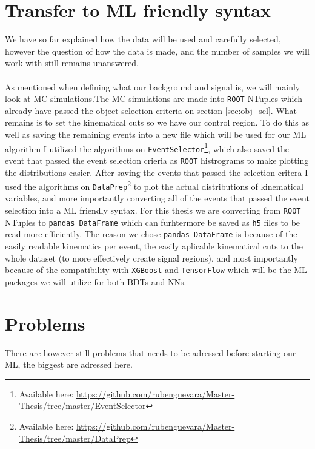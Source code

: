 \documentclass[12pt, a4paper]{book}
\begin{document}
\section{Transfer to ML friendly syntax}
We have so far explained how the data will be used and carefully selected, however the question of how the data is made, and the number of samples we will work with still remains unanswered. \\
\\As mentioned when defining what our background and signal is, we will mainly look at MC simulations.The MC simulations are made into \verb|ROOT| \cite{ROOT} NTuples which already have passed the object selection criteria on section \ref{sec:obj_sel}. What remains is to set the kinematical cuts so we have our control region. 
To do this as well as saving the remaining events into a new file which will be used for our ML algorithm I utilized the algorithms on \verb|EventSelector|\footnote{Available here: \href{https://github.com/rubenguevara/Master-Thesis/tree/master/EventSelector}{https://github.com/rubenguevara/Master-Thesis/tree/master/EventSelector}}, 
which also saved the event that passed the event selection crieria as \verb|ROOT| histrograms to make plotting the distributions easier. After saving the events that passed the selection critera I used the algorithms on \verb|DataPrep|\footnote{Available here: \href{https://github.com/rubenguevara/Master-Thesis/tree/master/DataPrep}{https://github.com/rubenguevara/Master-Thesis/tree/master/DataPrep}} 
to plot the actual distributions of kinematical variables, and more importantly converting all of the events that passed the event selection into a ML friendly syntax. For this thesis we are converting from \verb|ROOT| NTuples to \verb|pandas DataFrame| \cite{pd.DataFrame} 
which can furhtermore be saved as \verb|h5| files to be read more efficiently. The reason we chose \verb|pandas DataFrame| is because of the easily readable kinematics per event, the easily aplicable kinematical cuts to the whole dataset 
(to more effectively create signal regions), and most importantly because of the compatibility with \verb|XGBoost| \cite{XGBoost} and \verb|TensorFlow| \cite{TensorFlow} which will be the ML packages we will utilize for both BDTs and NNs.

\section{Problems}
There are however still problems that needs to be adressed before starting our ML, the biggest are adressed here.
\end{document}
